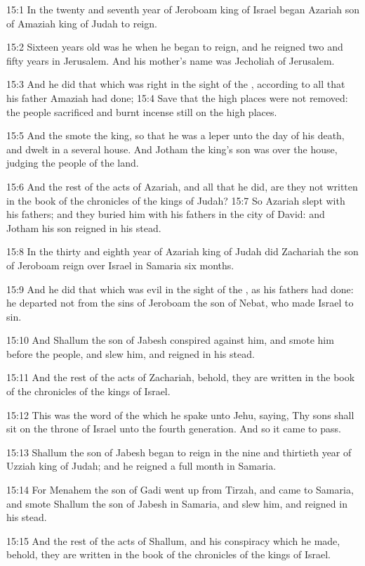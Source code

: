 15:1 In the twenty and seventh year of Jeroboam king of Israel began Azariah son of Amaziah king of Judah to reign.

15:2 Sixteen years old was he when he began to reign, and he reigned two and fifty years in Jerusalem. And his mother's name was Jecholiah of Jerusalem.

15:3 And he did that which was right in the sight of the \LORD, according to all that his father Amaziah had done; 15:4 Save that the high places were not removed: the people sacrificed and burnt incense still on the high places.

15:5 And the \LORD smote the king, so that he was a leper unto the day of his death, and dwelt in a several house. And Jotham the king's son was over the house, judging the people of the land.

15:6 And the rest of the acts of Azariah, and all that he did, are they not written in the book of the chronicles of the kings of Judah?  15:7 So Azariah slept with his fathers; and they buried him with his fathers in the city of David: and Jotham his son reigned in his stead.

15:8 In the thirty and eighth year of Azariah king of Judah did Zachariah the son of Jeroboam reign over Israel in Samaria six months.

15:9 And he did that which was evil in the sight of the \LORD, as his fathers had done: he departed not from the sins of Jeroboam the son of Nebat, who made Israel to sin.

15:10 And Shallum the son of Jabesh conspired against him, and smote him before the people, and slew him, and reigned in his stead.

15:11 And the rest of the acts of Zachariah, behold, they are written in the book of the chronicles of the kings of Israel.

15:12 This was the word of the \LORD which he spake unto Jehu, saying, Thy sons shall sit on the throne of Israel unto the fourth generation.  And so it came to pass.

15:13 Shallum the son of Jabesh began to reign in the nine and thirtieth year of Uzziah king of Judah; and he reigned a full month in Samaria.

15:14 For Menahem the son of Gadi went up from Tirzah, and came to Samaria, and smote Shallum the son of Jabesh in Samaria, and slew him, and reigned in his stead.

15:15 And the rest of the acts of Shallum, and his conspiracy which he made, behold, they are written in the book of the chronicles of the kings of Israel.

